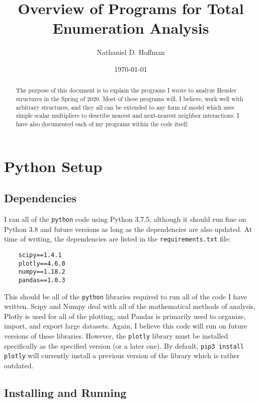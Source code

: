 \documentclass[12pt]{article}
\author{Nathaniel D. Hoffman}
\date{\today}
\title{Overview of Programs for Total Enumeration Analysis}
\begin{document}
\maketitle

\begin{abstract}
    The purpose of this document is to explain the programs I wrote to analyze Heusler structures in the Spring of 2020. Most of these programs will, I believe, work well with arbitrary structures, and they all can be extended to any form of model which uses simple scalar multipliers to describe nearest and next-nearest neighbor interactions. I have also documented each of my programs within the code itself.
\end{abstract}

\tableofcontents

\section{Python Setup}

\subsection{Dependencies}

I ran all of the \texttt{python} code using Python 3.7.5, although it should run fine on Python 3.8 and future versions as long as the dependencies are also updated. At time of writing, the dependencies are listed in the \texttt{requirements.txt} file:
\begin{verbatim}
    scipy==1.4.1
    plotly==4.6.0
    numpy==1.18.2
    pandas==1.0.3
\end{verbatim}

This should be all of the \texttt{python} libraries required to run all of the code I have written. Scipy and Numpy deal with all of the mathematical methods of analysis, Plotly is used for all of the plotting, and Pandas is primarily used to organize, import, and export large datasets. Again, I believe this code will run on future versions of these libraries. However, the \texttt{plotly} library must be installed specifically as the specified version (or a later one). By default, \texttt{pip3 install plotly} will currently install a previous version of the library which is rather outdated.

\subsection{Installing and Running}
\end{document}
